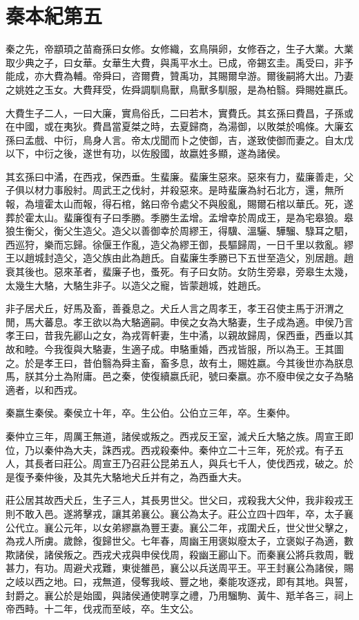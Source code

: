 \chapter{秦本紀第五}

秦之先，帝顓頊之苗裔孫曰女修。女修織，玄鳥隕卵，女修吞之，生子大業。大業取少典之子，曰女華。女華生大費，與禹平水土。已成，帝錫玄圭。禹受曰，非予能成，亦大費為輔。帝舜曰，咨爾費，贊禹功，其賜爾皁游。爾後嗣將大出。乃妻之姚姓之玉女。大費拜受，佐舜調馴鳥獸，鳥獸多馴服，是為柏翳。舜賜姓嬴氏。

大費生子二人，一曰大廉，實鳥俗氏，二曰若木，實費氏。其玄孫曰費昌，子孫或在中國，或在夷狄。費昌當夏桀之時，去夏歸商，為湯御，以敗桀於鳴條。大廉玄孫曰孟戲、中衍，鳥身人言。帝太戊聞而卜之使御，吉，遂致使御而妻之。自太戊以下，中衍之後，遂世有功，以佐殷國，故嬴姓多顯，遂為諸侯。

其玄孫曰中潏，在西戎，保西垂。生蜚廉。蜚廉生惡來。惡來有力，蜚廉善走，父子俱以材力事殷紂。周武王之伐紂，并殺惡來。是時蜚廉為紂石北方，還，無所報，為壇霍太山而報，得石棺，銘曰帝令處父不與殷亂，賜爾石棺以華氏。死，遂葬於霍太山。蜚廉復有子曰季勝。季勝生孟增。孟增幸於周成王，是為宅皋狼。皋狼生衡父，衡父生造父。造父以善御幸於周繆王，得驥、溫驪、驊騮、騄耳之駟，西巡狩，樂而忘歸。徐偃王作亂，造父為繆王御，長驅歸周，一日千里以救亂。繆王以趙城封造父，造父族由此為趙氏。自蜚廉生季勝已下五世至造父，別居趙。趙衰其後也。惡來革者，蜚廉子也，蚤死。有子曰女防。女防生旁皋，旁皋生太幾，太幾生大駱，大駱生非子。以造父之寵，皆蒙趙城，姓趙氏。

非子居犬丘，好馬及畜，善養息之。犬丘人言之周孝王，孝王召使主馬于汧渭之閒，馬大蕃息。孝王欲以為大駱適嗣。申侯之女為大駱妻，生子成為適。申侯乃言孝王曰，昔我先酈山之女，為戎胥軒妻，生中潏，以親故歸周，保西垂，西垂以其故和睦。今我復與大駱妻，生適子成。申駱重婚，西戎皆服，所以為王。王其圖之。於是孝王曰，昔伯翳為舜主畜，畜多息，故有土，賜姓嬴。今其後世亦為朕息馬，朕其分土為附庸。邑之秦，使復續嬴氏祀，號曰秦嬴。亦不廢申侯之女子為駱適者，以和西戎。

秦嬴生秦侯。秦侯立十年，卒。生公伯。公伯立三年，卒。生秦仲。

秦仲立三年，周厲王無道，諸侯或叛之。西戎反王室，滅犬丘大駱之族。周宣王即位，乃以秦仲為大夫，誅西戎。西戎殺秦仲。秦仲立二十三年，死於戎。有子五人，其長者曰莊公。周宣王乃召莊公昆弟五人，與兵七千人，使伐西戎，破之。於是復予秦仲後，及其先大駱地犬丘并有之，為西垂大夫。

莊公居其故西犬丘，生子三人，其長男世父。世父曰，戎殺我大父仲，我非殺戎王則不敢入邑。遂將擊戎，讓其弟襄公。襄公為太子。莊公立四十四年，卒，太子襄公代立。襄公元年，以女弟繆嬴為豐王妻。襄公二年，戎圍犬丘，世父世父擊之，為戎人所虜。歲餘，復歸世父。七年春，周幽王用褒姒廢太子，立褒姒子為適，數欺諸侯，諸侯叛之。西戎犬戎與申侯伐周，殺幽王酈山下。而秦襄公將兵救周，戰甚力，有功。周避犬戎難，東徙雒邑，襄公以兵送周平王。平王封襄公為諸侯，賜之岐以西之地。曰，戎無道，侵奪我岐、豐之地，秦能攻逐戎，即有其地。與誓，封爵之。襄公於是始國，與諸侯通使聘享之禮，乃用騮駒、黃牛、羝羊各三，祠上帝西畤。十二年，伐戎而至岐，卒。生文公。

